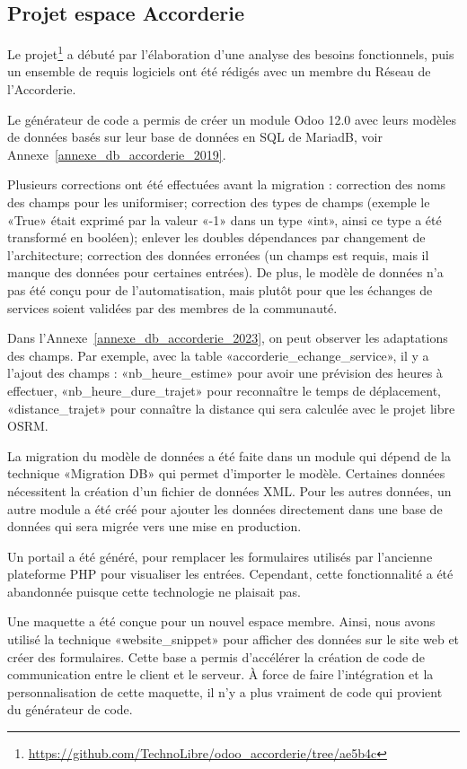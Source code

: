 \subsection{Projet espace Accorderie}

Le projet\footnote{\url{https://github.com/TechnoLibre/odoo_accorderie/tree/ae5b4c}} a débuté par l'élaboration d'une analyse des besoins fonctionnels, puis un ensemble de requis logiciels ont été rédigés avec un membre du Réseau de l'Accorderie. %

Le générateur de code a permis de créer un module Odoo 12.0 avec leurs modèles de données basés sur leur base de données en SQL de MariadB, voir Annexe~\ref{annexe_db_accorderie_2019}.

Plusieurs corrections ont été effectuées avant la migration : correction des noms des champs pour les uniformiser; correction des types de champs (exemple le «True» était exprimé par la valeur «-1» dans un type «int», ainsi ce type a été transformé en booléen); enlever les doubles dépendances par changement de l’architecture; correction des données erronées (un champs est requis, mais il manque des données pour certaines entrées). De plus, le modèle de données n’a pas été conçu pour de l’automatisation, mais plutôt pour que les échanges de services soient validées par des membres de la communauté.

Dans l'Annexe~\ref{annexe_db_accorderie_2023}, on peut observer les adaptations des champs. Par exemple, avec la table «accorderie\_echange\_service», il y a l'ajout des champs : «nb\_heure\_estime» pour avoir une prévision des heures à effectuer, «nb\_heure\_dure\_trajet» pour reconnaître le temps de déplacement, «distance\_trajet» pour connaître la distance qui sera calculée avec le projet libre OSRM.

La migration du modèle de données a été faite dans un module qui dépend de la technique «Migration DB» qui permet d'importer le modèle. Certaines données nécessitent la création d’un fichier de données XML. Pour les autres données, un autre module a été créé pour ajouter les données directement dans une base de données qui sera migrée vers une mise en production.

Un portail a été généré, pour remplacer les formulaires utilisés par l'ancienne plateforme PHP pour visualiser les entrées. Cependant, cette fonctionnalité a été abandonnée puisque cette technologie ne plaisait pas.

Une maquette a été conçue pour un nouvel espace membre. Ainsi, nous avons utilisé la technique «website\_snippet» pour afficher des données sur le site web et créer des formulaires. Cette base a permis d’accélérer la création de code de communication entre le client et le serveur. À force de faire l’intégration et la personnalisation de cette maquette, il n’y a plus vraiment de code qui provient du générateur de code.

